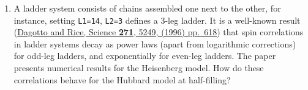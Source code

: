 \begin{enumerate}
\def\labelenumi{\arabic{enumi}.}
\tightlist
\item
  A ladder system consists of chains assembled one next to the other,
  for instance, setting \texttt{L1=14}, \texttt{L2=3} defines a 3-leg
  ladder. It is a well-known result
  (\href{doi.org/10.1126/science.271.5249.618}{Dagotto and Rice, Science
  \textbf{271}, 5249, (1996) pp.~618}) that spin correlations in ladder
  systems decay as power laws (apart from logarithmic corrections) for
  odd-leg ladders, and exponentially for even-leg ladders. The paper
  presents numerical results for the Heisenberg model. How do these
  correlations behave for the Hubbard model at half-filling?
\end{enumerate}


    
    
    
